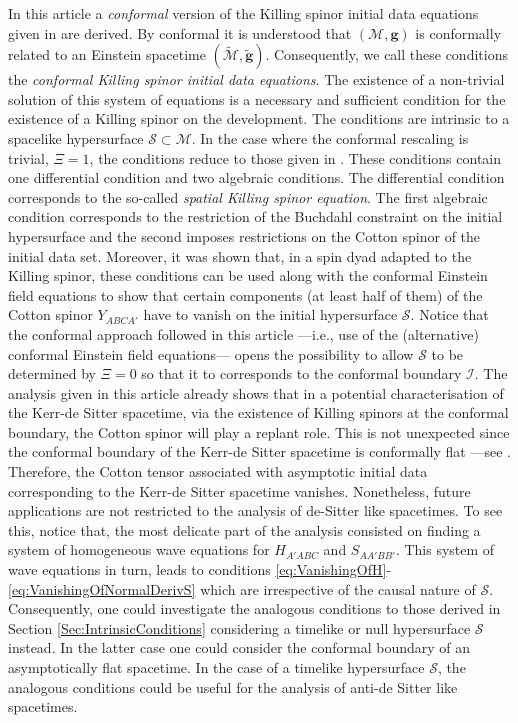 \documentclass[10pt,a4paper]{article}
\theoremstyle{plain}
\def\bmg{{\bm g}}
\begin{document}
In this article a \emph{conformal} version of the Killing spinor
initial data equations given in \cite{GarVal08c} are derived. By
conformal it is understood that $(\mathcal{M},\bmg)$ is conformally
related to an Einstein spacetime
$(\tilde{\mathcal{M}},\tilde{\bmg})$. Consequently, we call these
conditions the \emph{conformal Killing spinor initial data equations}.
The existence of a non-trivial solution of this system of equations is
a necessary and sufficient condition for the existence of a Killing
spinor on the development. The conditions are intrinsic to a spacelike
hypersurface $\mathcal{S}\subset\mathcal{M}$. In the
case where the conformal rescaling is trivial, $\Xi = 1$, the
conditions reduce to those given in \cite{BaeVal10b}.  These
conditions contain one differential condition and two algebraic
conditions.  The differential condition corresponds to the so-called
\emph{spatial Killing spinor equation}. The first algebraic condition
corresponds to the restriction of the Buchdahl constraint on the
initial hypersurface and the second imposes restrictions on the Cotton
spinor of the initial data set. Moreover, it was shown that, in a spin
dyad adapted to the Killing spinor, these conditions can be used along
with the conformal Einstein field equations to show that certain
components (at least half of them) of the Cotton spinor $Y_{ABCA'}$
have to vanish on the initial hypersurface $\mathcal{S}$.  Notice that
the conformal approach followed in this article ---i.e., use of the
(alternative) conformal Einstein field equations--- opens the
possibility to allow $\mathcal{S}$ to be determined by $\Xi = 0$ so
that it to corresponds to the conformal boundary $\mathscr{I}$. The
analysis given in this article already shows that in a potential
characterisation of the Kerr-de Sitter spacetime, via the existence of
Killing spinors at the conformal boundary, the Cotton spinor will play
a replant role. This is not unexpected since the conformal boundary of
the Kerr-de Sitter spacetime is conformally flat ---see
\cite{AshBonKes15a, Olz13}.  Therefore, the Cotton tensor associated
with asymptotic initial data corresponding to the Kerr-de Sitter
spacetime vanishes.  Nonetheless, future applications are not
restricted to the analysis of de-Sitter like spacetimes. To see this,
notice that, the most delicate part of the analysis consisted on
finding a system of homogeneous wave equations for $H_{A'ABC}$ and
$S_{AA'BB'}$. This system of wave equations in turn, leads to
conditions \eqref{eq:VanishingOfH}-\eqref{eq:VanishingOfNormalDerivS}
which are irrespective of the causal nature of
$\mathcal{S}$. Consequently, one could investigate the analogous
conditions to those derived in Section \ref{Sec:IntrinsicConditions}
considering a timelike or null hypersurface $\mathcal{S}$ instead. In
the latter case one could consider the conformal boundary of an
asymptotically flat spacetime. In the case of a timelike hypersurface
$\mathcal{S}$, the analogous conditions could be useful for the
 analysis of anti-de Sitter like spacetimes.
\end{document}
